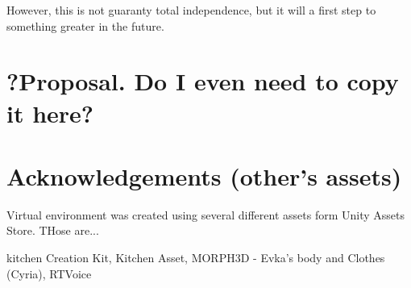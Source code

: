 \documentclass[18pt]{article}
\numberwithin{equation}{section} %
\numberwithin{figure}{section} %
\numberwithin{table}{section} %
\begin{document}
	However, this is not  guaranty total independence, but it will a first step to something greater in the future. \\
	

\section{?Proposal. Do I even need to copy it here?}	
\section{Acknowledgements (other's assets)}	
	Virtual environment was created using several different assets form Unity Assets Store. THose are...
	
	\large kitchen Creation Kit, Kitchen Asset, MORPH3D - Evka's body and Clothes (Cyria), RTVoice\\	
	

\newpage
\begin{flushleft}



\end{flushleft}
\end{document}
